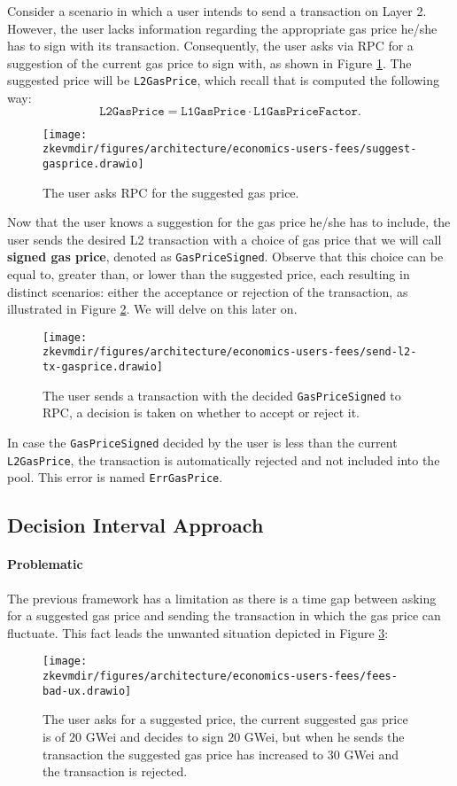 Consider a scenario in which a user intends to send a transaction on Layer 2. However, the user lacks information regarding the appropriate gas price he/she has to sign with its transaction. Consequently, the user asks via RPC for a suggestion of the current gas price to sign with, as shown in Figure \ref{fig:suggest-l2-gas-price}. The suggested price will be \texttt{L2GasPrice}, which recall that is computed the following way:
\[
\texttt{L2GasPrice} = \texttt{L1GasPrice} \cdot \texttt{L1GasPriceFactor}.
\]
\begin{figure}[H]
\centering
\texttt{[image: \\zkevmdir/figures/architecture/economics-users-fees/suggest-gasprice.drawio]}
\caption{The user asks RPC for the suggested gas price.}
\label{fig:suggest-l2-gas-price}
\end{figure}

Now that the user knows a suggestion for the gas price he/she has to include, the user sends the desired L2 transaction with a choice of gas price that we will call \textbf{signed gas price}, denoted as \texttt{GasPriceSigned}. Observe that this choice can be  equal to, greater than, or lower than the suggested price, each resulting in distinct scenarios: either the acceptance or rejection of the transaction, as illustrated in Figure \ref{fig:send-tx}. We will delve on this later on.
\begin{figure}[H]
\centering
\texttt{[image: \\zkevmdir/figures/architecture/economics-users-fees/send-l2-tx-gasprice.drawio]}
\caption{The user sends a transaction with the decided \texttt{GasPriceSigned} to RPC, a decision is taken on whether to accept or reject it.}
\label{fig:send-tx}
\end{figure}

In case the \texttt{GasPriceSigned} decided by the user is less than the current \texttt{L2GasPrice}, the transaction is automatically rejected and not included into the pool. This error is named \texttt{ErrGasPrice}.

\subsection{Decision Interval Approach}

\paragraph*{Problematic}

The previous framework has a limitation as there is a time gap between asking for a suggested gas price and sending the transaction in which the gas price can fluctuate. This fact leads the unwanted situation depicted in Figure \ref{fig:bad-ux}:
\begin{figure}[H]
\centering
\texttt{[image: \\zkevmdir/figures/architecture/economics-users-fees/fees-bad-ux.drawio]}
\caption{The user asks for a suggested price, the current suggested gas price is of $20$ GWei and decides to sign $20$ GWei, but when he sends the transaction the suggested gas price has increased to $30$ GWei and the transaction is rejected. }
\label{fig:bad-ux}
\end{figure}

